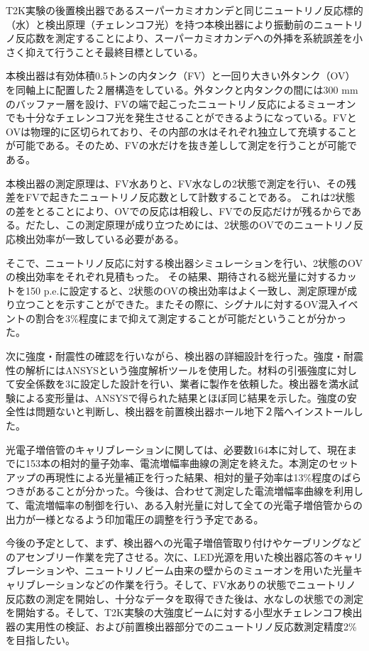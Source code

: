 \documentclass[11pt]{ltjsreport}
\begin{document}
T2K実験の後置検出器であるスーパーカミオカンデと同じニュートリノ反応標的（水）と検出原理（チェレンコフ光）を持つ本検出器により振動前のニュートリノ反応数を測定することにより、スーパーカミオカンデへの外挿を系統誤差を小さく抑えて行うことそ最終目標としている。

本検出器は有効体積0.5トンの内タンク（FV）と一回り大きい外タンク（OV）を同軸上に配置した２層構造をしている。外タンクと内タンクの間には300 mmのバッファー層を設け、FVの端で起こったニュートリノ反応によるミューオンでも十分なチェレンコフ光を発生させることができるようになっている。FVとOVは物理的に区切られており、その内部の水はそれぞれ独立して充填することが可能である。そのため、FVの水だけを抜き差しして測定を行うことが可能である。

本検出器の測定原理は、FV水ありと、FV水なしの2状態で測定を行い、その残差をFVで起きたニュートリノ反応数として計数することである。
これは2状態の差をとることにより、OVでの反応は相殺し、FVでの反応だけが残るからである。だたし、この測定原理が成り立つためには、2状態のOVでのニュートリノ反応検出効率が一致している必要がある。

そこで、ニュートリノ反応に対する検出器シミュレーションを行い、2状態のOVの検出効率をそれぞれ見積もった。
その結果、期待される総光量に対するカットを150 p.e.に設定すると、2状態のOVの検出効率はよく一致し、測定原理が成り立つことを示すことができた。またその際に、シグナルに対するOV混入イベントの割合を3\%程度にまで抑えて測定することが可能だということが分かった。

次に強度・耐震性の確認を行いながら、検出器の詳細設計を行った。強度・耐震性の解析にはANSYSという強度解析ツールを使用した。材料の引張強度に対して安全係数を3に設定した設計を行い、業者に製作を依頼した。検出器を満水試験による変形量は、ANSYSで得られた結果とほぼ同じ結果を示した。強度の安全性は問題ないと判断し、検出器を前置検出器ホール地下２階へインストールした。

光電子増倍管のキャリブレーションに関しては、必要数164本に対して、現在までに153本の相対的量子効率、電流増幅率曲線の測定を終えた。本測定のセットアップの再現性による光量補正を行った結果、相対的量子効率は13\%程度のばらつきがあることが分かった。今後は、合わせて測定した電流増幅率曲線を利用して、電流増幅率の制御を行い、ある入射光量に対して全ての光電子増倍管からの出力が一様となるよう印加電圧の調整を行う予定である。


今後の予定として、まず、検出器への光電子増倍管取り付けやケーブリングなどのアセンブリー作業を完了させる。次に、LED光源を用いた検出器応答のキャリブレーションや、ニュートリノビーム由来の壁からのミューオンを用いた光量キャリブレーションなどの作業を行う。そして、FV水ありの状態でニュートリノ反応数の測定を開始し、十分なデータを取得できた後は、水なしの状態での測定を開始する。そして、T2K実験の大強度ビームに対する小型水チェレンコフ検出器の実用性の検証、および前置検出器部分でのニュートリノ反応数測定精度2\%を目指したい。
\end{document}
